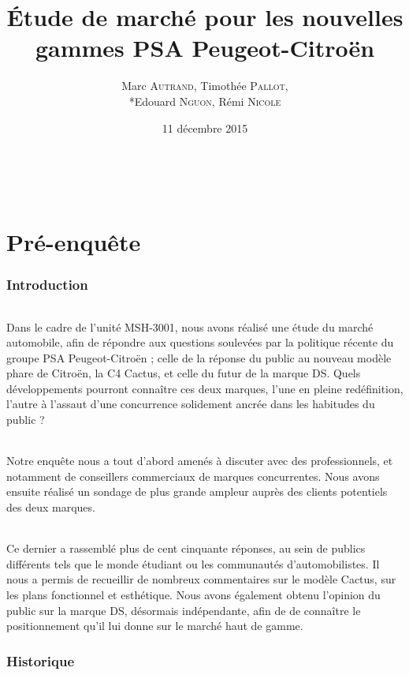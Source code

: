 \documentclass[12pt]{article}\usepackage[]{graphicx}\usepackage[]{color}
\title{\textbf{Étude de marché pour les nouvelles gammes PSA Peugeot-Citroën}}
\author{Marc \textsc{Autrand}, Timothée \textsc{Pallot},\\*Edouard
	\textsc{Nguon}, Rémi \textsc{Nicole}}
\date{11 décembre 2015}
\begin{document}
\maketitle

\break
~
\newpage
\break
\tableofcontents

\part{Pré-enquête}

\section{Introduction}

\paragraph{} Dans le cadre de l'unité MSH-3001, nous avons réalisé une étude du
marché automobile, afin de répondre aux questions soulevées par la politique récente
du groupe PSA Peugeot-Citroën ; celle de la réponse du public au nouveau modèle
phare de Citroën, la C4 Cactus, et celle du futur de la marque DS. Quels développements
pourront connaître ces deux marques, l'une en pleine redéfinition, l'autre à l'assaut
d'une concurrence solidement ancrée dans les habitudes du public ?

\paragraph{} Notre enquête nous a tout d'abord amenés à discuter avec des professionnels,
et notamment de conseillers commerciaux de marques concurrentes. Nous avons ensuite
réalisé un sondage de plus grande ampleur auprès des clients potentiels des deux marques.

\paragraph{} Ce dernier a rassemblé plus de cent cinquante réponses, au sein de publics
différents tels que le monde étudiant ou les communautés d'automobilistes. Il nous a
permis de recueillir de nombreux commentaires sur le modèle Cactus, sur les plans fonctionnel
et esthétique. Nous avons également obtenu l'opinion du public sur la marque DS, désormais
indépendante, afin de de connaître le positionnement qu'il lui donne sur le
marché haut de gamme.

\break
\section{Historique}
\end{document}
